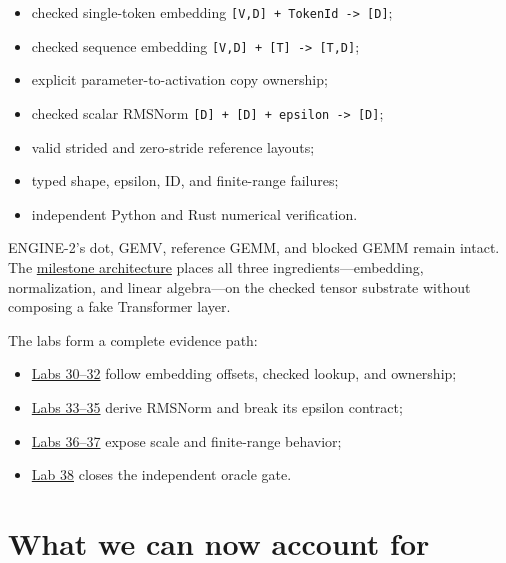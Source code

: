 \begin{itemize}
\tightlist
\item
  checked single-token embedding
  \texttt{{[}V,D{]}\ +\ TokenId\ -\textgreater{}\ {[}D{]}};
\item
  checked sequence embedding
  \texttt{{[}V,D{]}\ +\ {[}T{]}\ -\textgreater{}\ {[}T,D{]}};
\item
  explicit parameter-to-activation copy ownership;
\item
  checked scalar RMSNorm
  \texttt{{[}D{]}\ +\ {[}D{]}\ +\ epsilon\ -\textgreater{}\ {[}D{]}};
\item
  valid strided and zero-stride reference layouts;
\item
  typed shape, epsilon, ID, and finite-range failures;
\item
  independent Python and Rust numerical verification.
\end{itemize}

ENGINE-2's dot, GEMV, reference GEMM, and blocked GEMM remain intact.
The
\href{https://github.com/hermonai/inside-the-llm-engine/blob/astra-visual-rewrite/diagrams/transformer/chapter07-engine-architecture.txt}{milestone
architecture} places all three ingredients---embedding, normalization,
and linear algebra---on the checked tensor substrate without composing a
fake Transformer layer.

The labs form a complete evidence path:

\begin{itemize}
\tightlist
\item
\href{https://github.com/hermonai/inside-the-llm-engine/blob/astra-visual-rewrite/labs/README.md}{Labs
  30--32} follow embedding offsets, checked lookup, and ownership;
\item
\href{https://github.com/hermonai/inside-the-llm-engine/blob/astra-visual-rewrite/labs/README.md}{Labs
  33--35} derive RMSNorm and break its epsilon contract;
\item
\href{https://github.com/hermonai/inside-the-llm-engine/blob/astra-visual-rewrite/labs/README.md}{Labs
  36--37} expose scale and finite-range behavior;
\item
  \href{https://github.com/hermonai/inside-the-llm-engine/blob/astra-visual-rewrite/labs/lab-38-rust-python-rmsnorm.md}{Lab
  38} closes the independent oracle gate.
\end{itemize}

\section{What we can now account
for}\label{what-we-can-now-account-for}

